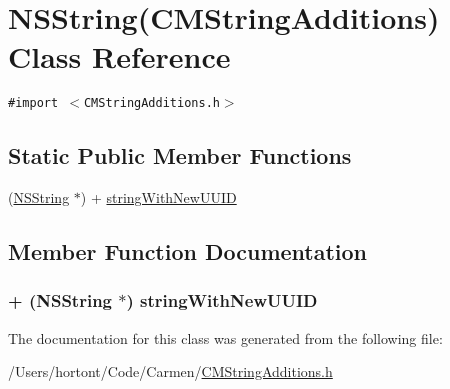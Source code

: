 \hypertarget{interface_n_s_string_07_c_m_string_additions_08}{
\section{NSString(CMStringAdditions) Class Reference}
\label{interface_n_s_string_07_c_m_string_additions_08}
}
{\tt \#import $<$CMStringAdditions.h$>$}

\subsection*{Static Public Member Functions}
\begin{CompactItemize}
\item 
(\hyperlink{class_n_s_string}{NSString} $\ast$) + \hyperlink{interface_n_s_string_07_c_m_string_additions_08_2dd24950b9a48cffe1fa20270ba51104}{stringWithNewUUID}
\end{CompactItemize}


\subsection{Member Function Documentation}
\hypertarget{interface_n_s_string_07_c_m_string_additions_08_2dd24950b9a48cffe1fa20270ba51104}{
\subsubsection[stringWithNewUUID]{\setlength{\rightskip}{0pt plus 5cm}+ ({\bf NSString} $\ast$) stringWithNewUUID }}
\label{interface_n_s_string_07_c_m_string_additions_08_2dd24950b9a48cffe1fa20270ba51104}




The documentation for this class was generated from the following file:\begin{CompactItemize}
\item 
/Users/hortont/Code/Carmen/\hyperlink{_c_m_string_additions_8h}{CMStringAdditions.h}\end{CompactItemize}
